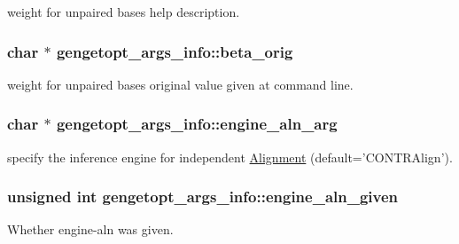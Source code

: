 weight for unpaired bases help description. 

\hypertarget{structgengetopt__args__info_a13737dc4f85cd3276f8cbb66e796a11d}{
\subsubsection[{beta\+\_\+orig}]{\setlength{\rightskip}{0pt plus 5cm}char $\ast$ gengetopt\+\_\+args\+\_\+info\+::beta\+\_\+orig}}\label{structgengetopt__args__info_a13737dc4f85cd3276f8cbb66e796a11d}


weight for unpaired bases original value given at command line. 

\hypertarget{structgengetopt__args__info_a80b9792246c023eb1ddd04336b226c1a}{
\subsubsection[{engine\+\_\+aln\+\_\+arg}]{\setlength{\rightskip}{0pt plus 5cm}char $\ast$ gengetopt\+\_\+args\+\_\+info\+::engine\+\_\+aln\+\_\+arg}}\label{structgengetopt__args__info_a80b9792246c023eb1ddd04336b226c1a}


specify the inference engine for independent \hyperlink{class_alignment}{Alignment} (default='C\+O\+N\+T\+R\+Align'). 

\hypertarget{structgengetopt__args__info_aabfb2ac097b504732bb06e9fec3ab25c}{
\subsubsection[{engine\+\_\+aln\+\_\+given}]{\setlength{\rightskip}{0pt plus 5cm}unsigned int gengetopt\+\_\+args\+\_\+info\+::engine\+\_\+aln\+\_\+given}}\label{structgengetopt__args__info_aabfb2ac097b504732bb06e9fec3ab25c}


Whether engine-\/aln was given. 


